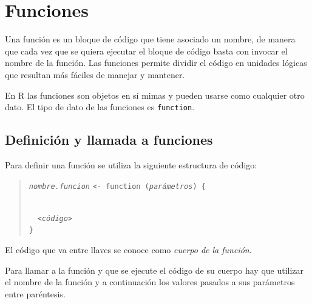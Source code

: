 \documentclass[
  spanish,
  a4paper,
]{scrreport}
\theoremstyle{definition}
\theoremstyle{definition}
\theoremstyle{remark}
\begin{document}

\chapter{Funciones}\label{funciones}

Una función es un bloque de código que tiene asociado un nombre, de
manera que cada vez que se quiera ejecutar el bloque de código basta con
invocar el nombre de la función. Las funciones permite dividir el código
en unidades lógicas que resultan más fáciles de manejar y mantener.

En R las funciones son objetos en sí mimas y pueden usarse como
cualquier otro dato. El tipo de dato de las funciones es
\texttt{function}.

\section{Definición y llamada a
funciones}\label{definiciuxf3n-y-llamada-a-funciones}

Para definir una función se utiliza la siguiente estructura de código:

\begin{quote}
\emph{\texttt{nombre.funcion}}
\texttt{\textless{}-\ function\ (}\emph{\texttt{parámetros}}\texttt{)\ \{}\strut \\
  \emph{\texttt{\textless{}código\textgreater{}}}\\
\texttt{\}}
\end{quote}

El código que va entre llaves se conoce como \emph{cuerpo de la
función}.

Para llamar a la función y que se ejecute el código de su cuerpo hay que
utilizar el nombre de la función y a continuación los valores pasados a
sus parámetros entre paréntesis.
\end{document}
